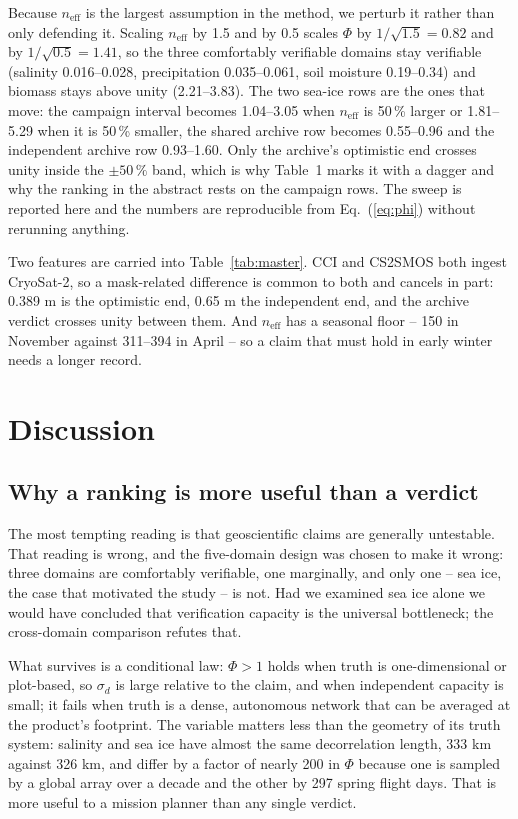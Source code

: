 \documentclass[preprint,12pt,authoryear]{elsarticle}
\begin{document}
Because $n_{\mathrm{eff}}$ is the largest assumption in the method, we perturb it
rather than only defending it. Scaling $n_{\mathrm{eff}}$ by 1.5 and by 0.5 scales
$\Phi$ by $1/\sqrt{1.5} = 0.82$ and by $1/\sqrt{0.5} = 1.41$, so the three
comfortably verifiable domains stay verifiable (salinity 0.016--0.028,
precipitation 0.035--0.061, soil moisture 0.19--0.34) and biomass stays above unity
(2.21--3.83). The two sea-ice rows are the ones that move: the campaign interval
becomes 1.04--3.05 when $n_{\mathrm{eff}}$ is 50\,\% larger or 1.81--5.29 when it is
50\,\% smaller, the shared archive row becomes 0.55--0.96 and the independent archive
row 0.93--1.60. Only the archive's
optimistic end crosses unity inside the $\pm 50\,\%$ band, which is why Table~1 marks
it with a dagger and why the ranking in the abstract rests on the campaign rows.
The sweep is reported here and the numbers are reproducible
from Eq.~(\ref{eq:phi}) without rerunning anything.

Two features are carried into Table~\ref{tab:master}. CCI and CS2SMOS both ingest CryoSat-2, so a mask-related difference is common to both and cancels in part: 0.389 m is the optimistic end, 0.65 m the independent end, and the archive verdict crosses unity between them. And $n_{\mathrm{eff}}$ has a seasonal floor -- 150 in November against 311--394 in April -- so a claim that must hold in early winter needs a longer record.

\section{Discussion}
\label{sec:discussion}

\subsection{Why a ranking is more useful than a verdict}

The most tempting reading is that geoscientific claims are generally untestable. That reading is wrong, and the five-domain design was chosen to make it wrong: three domains are comfortably verifiable, one marginally, and only one -- sea ice, the case that motivated the study -- is not. Had we examined sea ice alone we would have concluded that verification capacity is the universal bottleneck; the cross-domain comparison refutes that.

What survives is a conditional law: $\Phi > 1$ holds when truth is one-dimensional or plot-based, so $\sigma_d$ is large relative to the claim, and when independent capacity is small; it fails when truth is a dense, autonomous network that can be averaged at the product's footprint. The variable matters less than the geometry of its truth system: salinity and sea ice have almost the same decorrelation length, 333 km against 326 km, and differ by a factor of nearly 200 in $\Phi$ because one is sampled by a global array over a decade and the other by 297 spring flight days. That is more useful to a mission planner than any single verdict.
\end{document}
